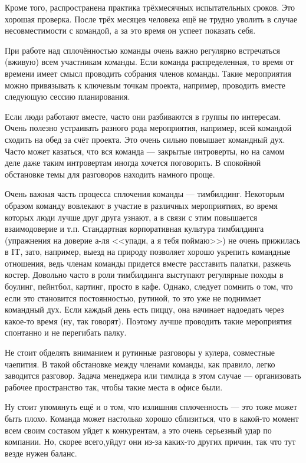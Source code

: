 \documentclass{../../text-style}
\begin{document}
Кроме того, распространена практика трёхмесячных испытательных сроков. Это хорошая проверка. После трёх месяцев человека ещё не трудно уволить в случае несовместимости с командой, а за это время он успеет показать себя.

При работе над сплочённостью команды очень важно регулярно встречаться (вживую) всем участникам команды. Если команда распределенная, то время от времени имеет смысл проводить собрания членов команды. Такие мероприятия можно привязывать к ключевым точкам проекта, например, проводить вместе следующую сессию планирования.

Если люди работают вместе, часто они разбиваются в группы по интересам. Очень полезно устраивать разного рода мероприятия, например, всей командой сходить на обед за счёт проекта. Это очень сильно повышает командный дух. Часто может казаться, что вся команда --- закрытые интроверты, но на самом деле даже таким интровертам иногда хочется поговорить. В спокойной обстановке темы для разговоров находить намного проще.

Очень важная часть процесса сплочения команды --- тимбилдинг. Некоторым образом команду вовлекают в участие в различных мероприятиях, во время которых люди лучше друг друга узнают, а в связи с этим повышается взаимодоверие и т.п. Стандартная корпоративная культура тимбилдинга (упражнения на доверие а-ля <<упади, а я тебя поймаю>>) не очень прижилась в IT, зато, например, выезд на природу позволяет хорошо укрепить командные отношения, ведь членам команды придется вместе расставить палатки, разжечь костер. Довольно часто в роли тимбилдинга выступают регулярные походы в боулинг, пейнтбол, картинг, просто в кафе. Однако, следует помнить о том, что если это становится постоянностью, рутиной, то это уже не поднимает командный дух. Если каждый день есть пиццу, она начинает надоедать через какое-то время (ну, так говорят). Поэтому лучше проводить такие мероприятия спонтанно и не перегибать палку.

Не стоит обделять вниманием и рутинные разговоры у кулера, совместные чаепития. В такой обстановке между членами команды, как правило, легко заводится разговор. Задача менеджера или тимлида в этом случае --- организовать рабочее пространство так, чтобы такие места в офисе были.

Ну стоит упомянуть ещё и о том, что излишняя сплоченность --- это тоже может быть плохо. Команда может настолько хорошо сблизиться, что в какой-то момент всем своим составом уйдет к конкурентам, а это очень серьезный удар по компании. Но, скорее всего,уйдут они из-за каких-то других причин, так что тут везде нужен баланс.
\end{document}

